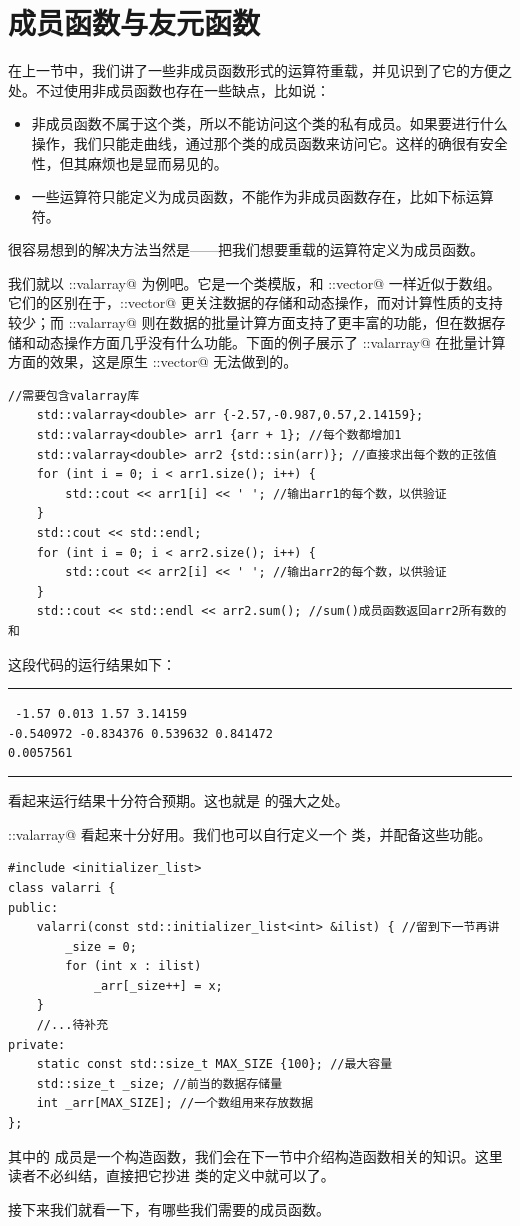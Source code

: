 \section{成员函数与友元函数}
在上一节中，我们讲了一些非成员函数形式的运算符重载，并见识到了它的方便之处。不过使用非成员函数也存在一些缺点，比如说：
\begin{itemize}
    \item 非成员函数不属于这个类，所以不能访问这个类的私有成员。如果要进行什么操作，我们只能走曲线，通过那个类的成员函数来访问它。这样的确很有安全性，但其麻烦也是显而易见的。
    \item 一些运算符只能定义为成员函数，不能作为非成员函数存在，比如下标运算符。
\end{itemize}
很容易想到的解决方法当然是——把我们想要重载的运算符定义为成员函数。\par
我们就以 \lstinline@std::valarray@ 为例吧。它是一个类模版，和 \lstinline@std::vector@ 一样近似于数组。它们的区别在于，\lstinline@std::vector@ 更关注数据的存储和动态操作，而对计算性质的支持较少；而 \lstinline@std::valarray@ 则在数据的批量计算方面支持了更丰富的功能，但在数据存储和动态操作方面几乎没有什么功能。下面的例子展示了 \lstinline@std::valarray@ 在批量计算方面的效果，这是原生 \lstinline@std::vector@ 无法做到的。
\begin{lstlisting}
//需要包含valarray库
    std::valarray<double> arr {-2.57,-0.987,0.57,2.14159};
    std::valarray<double> arr1 {arr + 1}; //每个数都增加1
    std::valarray<double> arr2 {std::sin(arr)}; //直接求出每个数的正弦值
    for (int i = 0; i < arr1.size(); i++) {
        std::cout << arr1[i] << ' '; //输出arr1的每个数，以供验证
    }
    std::cout << std::endl;
    for (int i = 0; i < arr2.size(); i++) {
        std::cout << arr2[i] << ' '; //输出arr2的每个数，以供验证
    }
    std::cout << std::endl << arr2.sum(); //sum()成员函数返回arr2所有数的和
\end{lstlisting}
这段代码的运行结果如下：\\\noindent\rule{\linewidth}{.2pt}\texttt{
-1.57 0.013 1.57 3.14159\\
-0.540972 -0.834376 0.539632 0.841472\\
0.0057561
}\\\noindent\rule{\linewidth}{.2pt}
看起来运行结果十分符合预期。这也就是 \lstinline@valarray@ 的强大之处。\par
\lstinline@std::valarray@ 看起来十分好用。我们也可以自行定义一个 \lstinline@valarri@ 类，并配备这些功能。
\begin{lstlisting}
#include <initializer_list>
class valarri {
public:
    valarri(const std::initializer_list<int> &ilist) { //留到下一节再讲
        _size = 0;
        for (int x : ilist)
            _arr[_size++] = x;
    }
    //...待补充
private:
    static const std::size_t MAX_SIZE {100}; //最大容量
    std::size_t _size; //前当的数据存储量
    int _arr[MAX_SIZE]; //一个数组用来存放数据
};
\end{lstlisting}
其中的 \lstinline@valarri@ 成员是一个构造函数，我们会在下一节中介绍构造函数相关的知识。这里读者不必纠结，直接把它抄进 \lstinline@valarri@ 类的定义中就可以了。\par
接下来我们就看一下，有哪些我们需要的成员函数。\par
